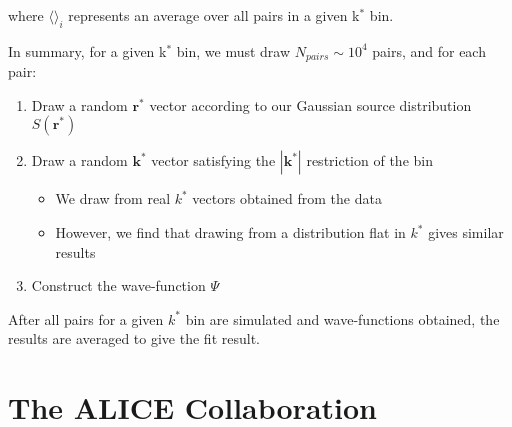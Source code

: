 \documentclass[ALICE,manyauthors]{cernphprep}
\newcommand{\kstar}{$k^{*}$\xspace}
\begin{document}
where $\langle \rangle_{i}$ represents an average over all pairs in a given k$^{*}$ bin.

In summary, for a given k$^{*}$ bin, we must draw $N_{pairs} \sim 10^{4}$ pairs, and for each pair:

\begin{enumerate}
 \item Draw a random $\mathbf{r}^{*}$ vector according to our Gaussian source distribution $S(\mathbf{r}^{*})$
 \item Draw a random $\mathbf{k}^{*}$ vector satisfying the $|\mathbf{k}^{*}|$ restriction of the bin
 \begin{itemize}
  \item We draw from real \kstar vectors obtained from the data
  \item However, we find that drawing from a distribution flat in \kstar gives similar results
 \end{itemize}
 \item Construct the wave-function $\Psi$
\end{enumerate}

After all pairs for a given \kstar bin are simulated and wave-functions obtained, the results are averaged to give the fit result.


\section{The ALICE Collaboration}
\label{app:collab}
\end{document}
